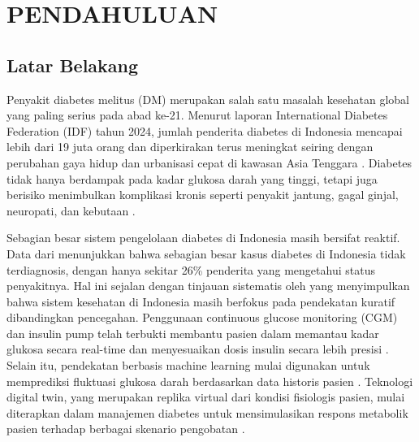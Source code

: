 \documentclass[12pt,a4paper,oneside]{book}
\begin{document}
\captionsetup[figure]{labelsep=space}
\captionsetup[table]{labelsep=space}
\captionsetup[lstlisting]{labelsep=space}

\setlength{\parindent}{0pt}
      
\chapter{PENDAHULUAN}

\section{Latar Belakang}

Penyakit diabetes melitus (DM) merupakan salah satu masalah kesehatan global yang paling serius pada abad ke-21. Menurut laporan International Diabetes Federation (IDF) tahun 2024, jumlah penderita diabetes di Indonesia mencapai lebih dari 19 juta orang dan diperkirakan terus meningkat seiring dengan perubahan gaya hidup dan urbanisasi cepat di kawasan Asia Tenggara \autocite{IDF2024}. Diabetes tidak hanya berdampak pada kadar glukosa darah yang tinggi, tetapi juga berisiko menimbulkan komplikasi kronis seperti penyakit jantung, gagal ginjal, neuropati, dan kebutaan \autocite{WHO2023}.

Sebagian besar sistem pengelolaan diabetes di Indonesia masih bersifat reaktif. Data dari \textcite{Riskesdas2018, KSI2020} menunjukkan bahwa sebagian besar kasus diabetes di Indonesia tidak terdiagnosis, dengan hanya sekitar 26\% penderita yang mengetahui status penyakitnya. Hal ini sejalan dengan tinjauan sistematis oleh \textcite{Alkaff2021} yang menyimpulkan bahwa sistem kesehatan di Indonesia masih berfokus pada pendekatan kuratif dibandingkan pencegahan. Penggunaan continuous glucose monitoring (CGM) dan insulin pump telah terbukti membantu pasien dalam memantau kadar glukosa secara real-time dan menyesuaikan dosis insulin secara lebih presisi \autocite{Battelino2019}. Selain itu, pendekatan berbasis machine learning mulai digunakan untuk memprediksi fluktuasi glukosa darah berdasarkan data historis pasien \textcite{Woldaregay2019}. Teknologi digital twin, yang merupakan replika virtual dari kondisi fisiologis pasien, mulai diterapkan dalam manajemen diabetes untuk mensimulasikan respons metabolik pasien terhadap berbagai skenario pengobatan \autocite{Bruynseels2018}.
\end{document}
